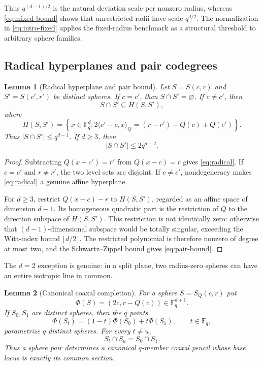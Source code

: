 \documentclass[11pt,letterpaper]{amsart}
\newtheorem{lemma}[lemma]{Lemma}
\theoremstyle{definition}
\theoremstyle{remark}
\newcommand{\1}{\mathbf 1}
\newcommand{\ip}[2]{\langle #1,#2\rangle_Q}
\begin{document}
Thus $q^{(d-1)/2}$ is the natural deviation scale per nonzero radius, whereas \eqref{eq:mixed-bound} shows that unrestricted radii have scale $q^{d/2}$.  The normalization in \eqref{eq:intro-fixed} applies the fixed-radius benchmark as a structural threshold to arbitrary sphere families.

\subsection{Radical hyperplanes and pair codegrees}

\begin{lemma}[Radical hyperplane and pair bound]\label{lem:radical}
Let $S=S(c,r)$ and $S'=S(c',r')$ be distinct spheres.  If $c=c'$, then $S\cap S'=\varnothing$.  If $c\ne c'$, then
\[
 S\cap S'\subseteq H(S,S'),
\]
where
\begin{equation}\label{eq:radical}
 H(S,S')=
 \left\{x\in\mathbb F_q^d:
 2\ip{c'-c}{x}=(r-r')-Q(c)+Q(c')\right\}.
\end{equation}
Thus $|S\cap S'|\le q^{d-1}$.  If $d\ge3$, then
\begin{equation}\label{eq:pair-bound}
 |S\cap S'|\le2q^{d-2}.
\end{equation}
\end{lemma}

\begin{proof}
Subtracting $Q(x-c')=r'$ from $Q(x-c)=r$ gives \eqref{eq:radical}.  If $c=c'$ and $r\ne r'$, the two level sets are disjoint.  If $c\ne c'$, nondegeneracy makes \eqref{eq:radical} a genuine affine hyperplane.

For $d\ge3$, restrict $Q(x-c)-r$ to $H(S,S')$, regarded as an affine space of dimension $d-1$.  Its homogeneous quadratic part is the restriction of $Q$ to the direction subspace of $H(S,S')$.  This restriction is not identically zero: otherwise that $(d-1)$-dimensional subspace would be totally singular, exceeding the Witt-index bound $\lfloor d/2\rfloor$.  The restricted polynomial is therefore nonzero of degree at most two, and the Schwartz--Zippel bound gives \eqref{eq:pair-bound}.
\end{proof}

The $d=2$ exception is genuine: in a split plane, two radius-zero spheres can have an entire isotropic line in common.

\begin{lemma}[Canonical coaxal completion]\label{lem:coaxal}
For a sphere $S=S_Q(c,r)$ put
\[
 \Phi(S)=(2c,r-Q(c))\in\mathbb F_q^{d+1}.
\]
If $S_0,S_1$ are distinct spheres, then the $q$ points
\[
 \Phi(S_t)=(1-t)\Phi(S_0)+t\Phi(S_1),
 \qquad t\in\mathbb F_q,
\]
parametrize $q$ distinct spheres.  For every $t\ne u$,
\[
 S_t\cap S_u=S_0\cap S_1.
\]
Thus a sphere pair determines a canonical $q$-member coaxal pencil whose base locus is exactly its common section.
\end{lemma}
\end{document}
